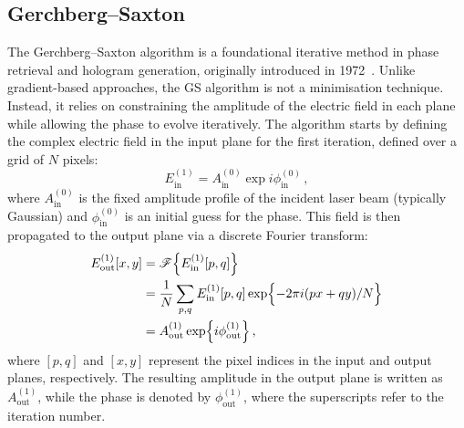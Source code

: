 \documentclass[../Thesis-IJspeert.tex]{subfiles}
\begin{document}
\subsection{Gerchberg--Saxton}
The Gerchberg--Saxton algorithm is a foundational iterative method in phase retrieval and hologram generation, originally introduced in 1972~\cite{GS}. Unlike gradient-based approaches, the GS algorithm is not a minimisation technique. Instead, it relies on constraining the amplitude of the electric field in each plane while allowing the phase to evolve iteratively. The algorithm starts by defining the complex electric field in the input plane for the first iteration, defined over a grid of $N$ pixels:
\begin{equation}
\label{initialein}
E_{\mathrm{in}}^{(1)} = A_{\mathrm{in}}^{(0)} \exp{i \phi_{\mathrm{in}}^{(0)}}\,,
\end{equation}
where $A_{\mathrm{in}}^{(0)}$ is the fixed amplitude profile of the incident laser beam (typically Gaussian) and $\phi_{\mathrm{in}}^{(0)}$ is an initial guess for the phase. This field is then propagated to the output plane via a discrete Fourier transform:
\begin{align}
\label{forwardfourier}
\begin{split}
E_{\mathrm{out}}^{(1)}[x,y] &= \mathcal{F}\left\{ E_{\mathrm{in}}^{(1)} [p,q]\right\} \\&= \frac{1}{N}\sum_{p,q} E_\mathrm{in}^{(1)}[p,q] \exp\Bigl\{-2\pi i (px + qy) /N \Bigr\} \\&= A_{\mathrm{out}}^{(1)} \exp\Bigl\{i \phi_{\mathrm{out}}^{(1)} \Bigr\} \,,
\end{split}
\end{align}
where $[p,q]$ and $[x,y]$ represent the pixel indices in the input and output planes, respectively. The resulting amplitude in the output plane is written as $A_{\mathrm{out}}^{(1)}$, while the phase is denoted by $\phi_{\mathrm{out}}^{(1)}$, where the superscripts refer to the iteration number.
\end{document}
